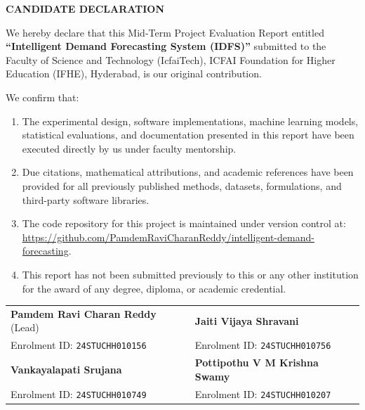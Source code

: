 \documentclass[12pt,a4paper,oneside]{report}
\theoremstyle{definition}
\begin{document}
\newpage
\thispagestyle{plain}
\begin{center}
    {\LARGE \textbf{CANDIDATE DECLARATION}}\\[1.0cm]
\end{center}

\noindent We hereby declare that this Mid-Term Project Evaluation Report entitled \textbf{``Intelligent Demand Forecasting System (IDFS)''} submitted to the Faculty of Science and Technology (IcfaiTech), ICFAI Foundation for Higher Education (IFHE), Hyderabad, is our original contribution. 

\noindent We confirm that:
\begin{enumerate}[itemsep=0.3cm]
    \item The experimental design, software implementations, machine learning models, statistical evaluations, and documentation presented in this report have been executed directly by us under faculty mentorship.
    \item Due citations, mathematical attributions, and academic references have been provided for all previously published methods, datasets, formulations, and third-party software libraries.
    \item The code repository for this project is maintained under version control at: \url{https://github.com/PamdemRaviCharanReddy/intelligent-demand-forecasting}.
    \item This report has not been submitted previously to this or any other institution for the award of any degree, diploma, or academic credential.
\end{enumerate}

\vspace{2.5cm}

\noindent
\begin{tabular}{ll}
\textbf{Pamdem Ravi Charan Reddy} (Lead) & \quad \textbf{Jaiti Vijaya Shravani} \\
Enrolment ID: \texttt{24STUCHH010156} & \quad Enrolment ID: \texttt{24STUCHH010756} \\[1.5cm]
\textbf{Vankayalapati Srujana} & \quad \textbf{Pottipothu V M Krishna Swamy} \\
Enrolment ID: \texttt{24STUCHH010749} & \quad Enrolment ID: \texttt{24STUCHH010207} \\
\end{tabular}
\end{document}
